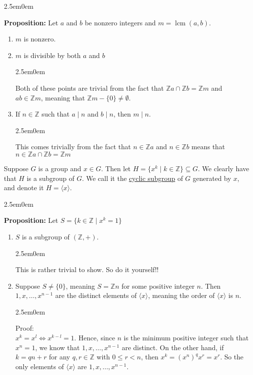 \documentclass{book}
\newcommand{\hTwo}{%
\color{MidnightBlue}%
   \fontsize{13}{15}\selectfont%
}
\newcommand{\hThree}{%
   \color{PineGreen!85!Orange}
   \fontsize{12}{14}\selectfont%
}
\newenvironment{myIndent}{%
   \begin{adjustwidth}{2.5em}{0em}%
}{%
   \end{adjustwidth}%
}
\newcommand{\udefine}[1]{{%
   \setulcolor{Red}%
   \setul{0.14em}{0.07em}%
   \ul{#1}%
}}
\newcommand{\blab}[1]{\textbf{#1}}
\newcommand{\divides}{\mathop{\mid}}
\DeclareMathOperator{\lcm}{lcm}
\newcommand{\retTwo}{\hfill\bigbreak}
\begin{document}
\begin{myIndent}\hTwo
	\blab{Proposition:} Let $a$ and $b$ be nonzero integers and $m = \lcm(a, b)$.
	\begin{enumerate}
		\item $m$ is nonzero.
		\item $m$ is divisible by both $a$ and $b$
		\begin{myIndent}\hThree
			Both of these points are trivial from the fact that $\mathbb{Z}a \cap \mathbb{Z}b = \mathbb{Z}m$ and\\ $ab \in \mathbb{Z}m$, meaning that $\mathbb{Z}m - \{0\} \neq \emptyset$.
		\end{myIndent}
		\item If $n \in \mathbb{Z}$ such that $a \divides n$ and $b \divides n$, then $m \divides n$.
		\begin{myIndent}\hThree
			This comes trivially from the fact that $n \in \mathbb{Z}a$ and $n \in \mathbb{Z}b$ means that\\ $n \in \mathbb{Z}a \cap \mathbb{Z}b = \mathbb{Z}m$\retTwo
		\end{myIndent}
	\end{enumerate}
\end{myIndent}


Suppose $G$ is a group and $x \in G$. Then let $H = \{x^k \mid k \in \mathbb{Z}\} \subseteq G$. We clearly have that $H$ is a subgroup of $G$. We call it the \udefine{cyclic subgroup} of $G$ generated by $x$, and denote it $H = \langle x \rangle$.

\begin{myIndent}\hTwo
	\blab{Proposition:} Let $S = \{k \in \mathbb{Z} \mid x^k = 1\}$
	\begin{enumerate}
		\item $S$ is a subgroup of $(\mathbb{Z}, +)$.
		\begin{myIndent}\hThree
			This is rather trivial to show. So do it yourself!!
		\end{myIndent}
		\item Suppose $S \neq \{0\}$, meaning $S = \mathbb{Z}n$ for some positive integer $n$. Then\\ $1, x, \ldots, x^{n-1}$ are the distinct elements of $\langle x \rangle$, meaning the order of $\langle x \rangle$ is $n$.
		
		\begin{myIndent}\hThree
			Proof:\\
			$x^{k} = x^{l} \Longleftrightarrow x^{k-l} = 1$. Hence, since $n$ is the minimum positive integer such that $x^n = 1$, we know that $1, x, \ldots, x^{n-1}$ are distinct. On the other hand, if $k = qn + r$ for any $q, r \in \mathbb{Z}$ with $0 \leq r < n$, then $x^k = (x^n)^qx^r = x^r$. So the only elements of $\langle x \rangle$ are $1, x, \ldots, x^{n-1}$.\retTwo
		\end{myIndent}
	\end{enumerate}
\end{myIndent}
\end{document}
